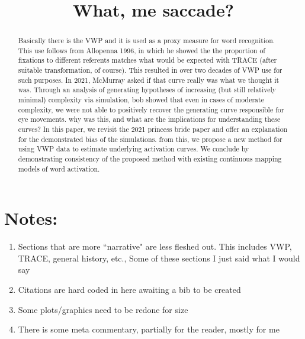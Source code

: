 \documentclass{article}
\title{What, me saccade?}
\date{}
\begin{document}

\maketitle

%

\begin{abstract}
Basically there is the VWP and it is used as a proxy measure for word recognition. This use follows from Allopenna 1996, in which he showed the the proportion of fixations to different referents matches what would be expected with TRACE (after suitable transformation, of course). This resulted in over two decades of VWP use for such purposes. In 2021, McMurray asked if that curve really was what we thought it was. Through an analysis of generating hypotheses of increasing (but still relatively minimal) complexity via simulation, bob showed that even in cases of moderate complexity, we were not able to positively recover the generating curve responsible for eye movements. why was this, and what are the implications for understanding these curves? In this paper, we revisit the 2021 princess bride paper and offer an explanation for the demonstrated bias of the simulations. from this, we propose a new method for using VWP data to estimate underlying activation curves. We conclude by demonstrating consistency of the proposed method with existing continuous mapping models of word activation.
\end{abstract}

\section*{Notes:}

\begin{singlespace}
\begin{enumerate}
\vspace{-3mm}
\item Sections that are more ``narrative" are less fleshed out. This includes VWP, TRACE, general history, etc., Some of these sections I just said what I would say
\item Citations are hard coded in here awaiting a bib to be created
\item Some plots/graphics need to be redone for size
\item There is some meta commentary, partially for the reader, mostly for me
\end{enumerate}
\end{singlespace}
\end{document}
